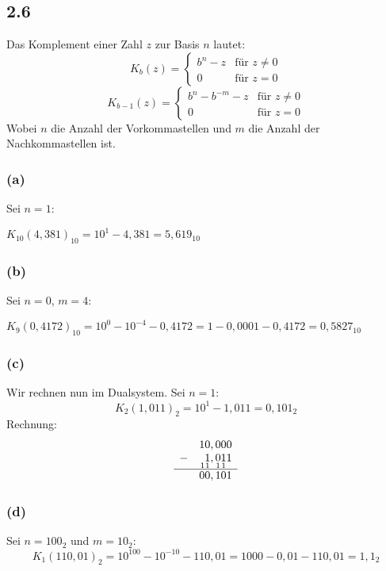 \documentclass[12pt,a4paper]{article}
\begin{document}
 


 
 
 
 \subsection*{2.6} 
 Das Komplement einer Zahl $z$ zur Basis $n$ lautet: 
 $$K_b(z) = \begin{cases} b^n− z & \textrm{für } z \neq 0\\
0& \textrm{für } z = 0\end{cases}$$
$$K_{b-1}(z) =  \begin{cases} b^n - b^{-m}− z & \textrm{für } z \neq 0\\
0& \textrm{für } z = 0\end{cases}$$
 Wobei $n$ die Anzahl der Vorkommastellen und $m$ die Anzahl der Nachkommastellen ist.
 \subsubsection*{(a)} Sei $n = 1$:
  
 $K_{10}(4,381)_{10} = 10^1 - 4,381 = 5,619_{10}$
 \subsubsection*{(b)}Sei $n = 0$, $m=4$:
 
 $K_9(0,4172)_{10} = 10^0 - 10^{-4} - 0,4172 = 1 - 0,0001 - 0,4172  = 0,5827_{10}$
 \subsubsection*{(c)}
 Wir rechnen nun im Dualsystem. Sei $n = 1$:
 $$K_2(1,011)_2 = 10^1 - 1,011 = 0,101_2$$
 Rechnung:
 $$
 \begin{array}{r r}
 &10,000\\
 -&\underset{1}{\;}\underset{1}{1},\underset{1}{0}\underset{1}{1}\underset{\;}{1}\\
 \hline
 &00,101 
 \end{array}$$
 \subsubsection*{(d)}Sei $n=100_2$ und $m=10_2$: 
 $$K_1(110,01)_2 = 10^{100} - 10^{-10} - 110,01 = 1000 - 0,01 - 110,01 = 1,1_2$$
 
\end{document}
